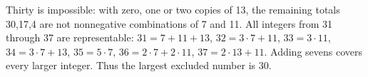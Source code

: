 Thirty is impossible: with zero, one or two copies of 13, the remaining totals 30,17,4 are not nonnegative combinations of 7 and 11. All integers from 31 through 37 are representable: $31=7+11+13$, $32=3\cdot7+11$, $33=3\cdot11$, $34=3\cdot7+13$, $35=5\cdot7$, $36=2\cdot7+2\cdot11$, $37=2\cdot13+11$. Adding sevens covers every larger integer. Thus the largest excluded number is $\boxed{30}$.
